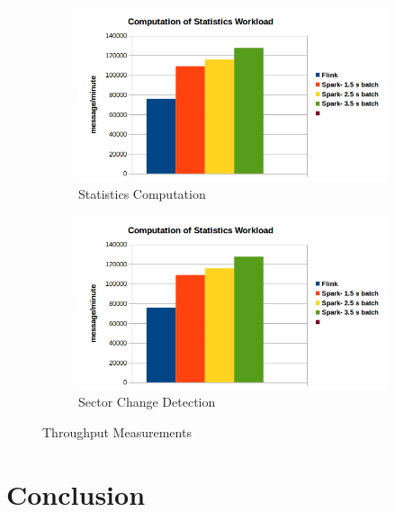 \documentclass[]{article}
\begin{document}
\begin{figure}[h]
\centering
\begin{subfigure}{.5\textwidth}
  \centering
  \includegraphics[width=\linewidth]{throughput1.png}
  \caption{Statistics Computation}

\end{subfigure}%
\begin{subfigure}{.5\textwidth}
  \centering
  \includegraphics[width=\linewidth]{throughput1.png}
\caption{Sector Change Detection }

\end{subfigure}
\caption{Throughput Measurements}
\label{fig:fig}
\end{figure}



\section{Conclusion}
\end{document}
